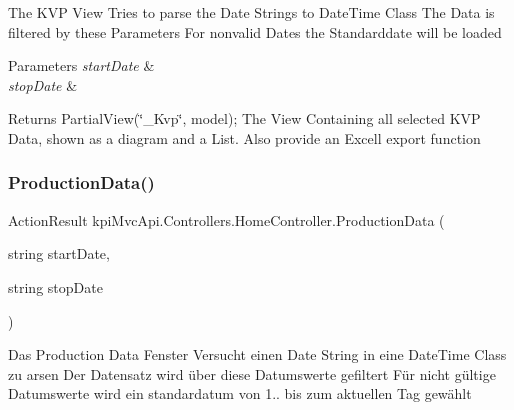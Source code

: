 The K\+VP View Tries to parse the Date Strings to Date\+Time Class The Data is filtered by these Parameters For nonvalid Dates the Standarddate will be loaded 


\begin{DoxyParams}{Parameters}
{\em start\+Date} & \\
\hline
{\em stop\+Date} & \\
\hline
\end{DoxyParams}
\begin{DoxyReturn}{Returns}
{\ttfamily Partial\+View(\char`\"{}\+\_\+\+Kvp\char`\"{}, model);} The View Containing all selected K\+VP Data, shown as a diagram and a List. Also provide an Excell export function 
\end{DoxyReturn}
\mbox{\label{classkpi_mvc_api_1_1_controllers_1_1_home_controller_ae5c2fcc4413eda2cab2775cd9819efca}} 
\subsubsection{\texorpdfstring{Production\+Data()}{ProductionData()}}
{\footnotesize\ttfamily Action\+Result kpi\+Mvc\+Api.\+Controllers.\+Home\+Controller.\+Production\+Data (\begin{DoxyParamCaption}\item[{string}]{start\+Date,  }\item[{string}]{stop\+Date }\end{DoxyParamCaption})\hspace{0.3cm}{\ttfamily [inline]}}



Das Production Data Fenster Versucht einen Date String in eine Date\+Time Class zu arsen Der Datensatz wird über diese Datumswerte gefiltert Für nicht gültige Datumswerte wird ein standardatum von 1.. bis zum aktuellen Tag gewählt 


